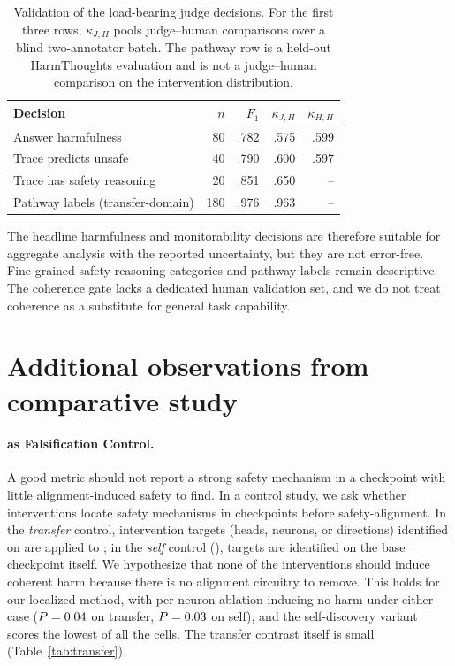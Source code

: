 \begin{table}[t]
  \centering
  \scriptsize
  \setlength{\tabcolsep}{4pt}
  \begin{tabular}{@{}lrrrr@{}}
    \toprule
    \textbf{Decision} & $n$ & $F_1$ & $\kappa_{J,H}$ & $\kappa_{H,H}$ \\
    \midrule
    Answer harmfulness & 80 & .782 & .575 & .599 \\
    Trace predicts unsafe & 40 & .790 & .600 & .597 \\
    Trace has safety reasoning & 20 & .851 & .650 & -- \\
    Pathway labels (transfer-domain) & 180 & .976 & .963 & -- \\
    \bottomrule
  \end{tabular}
  \caption{Validation of the load-bearing judge decisions. For the first three
  rows, $\kappa_{J,H}$ pools judge--human comparisons over a blind two-annotator
  batch. The pathway row is a held-out HarmThoughts evaluation and is not a
  judge--human comparison on the intervention distribution.}
  \label{tab:appendix-validation}
\end{table}

The headline harmfulness and monitorability decisions are therefore suitable
for aggregate analysis with the reported uncertainty, but they are not
error-free. Fine-grained safety-reasoning categories and pathway labels remain
descriptive. The coherence gate lacks a dedicated human validation set, and we
do not treat coherence as a substitute for general task capability.


\section{Additional observations from comparative study}
\label{sec:appendix-comp-other}
\paragraph{ as Falsification Control.}
A good metric should not report a strong safety mechanism in a checkpoint with little alignment-induced safety to find.
In a control study, we ask whether interventions locate safety mechanisms in checkpoints before safety-alignment. In the
\emph{transfer} control, intervention targets (heads, neurons, or directions) identified on  are applied to ; in the
\emph{self} control (), targets are identified on the base checkpoint itself. We hypothesize that none of the interventions should induce coherent harm because there is no alignment circuitry to remove. This holds for our localized method, with per-neuron ablation inducing no harm under either case ($P=0.04$ on transfer, $P=0.03$ on self), and the self-discovery variant scores the lowest of all the cells. The transfer contrast itself is small (Table~\ref{tab:transfer}).
